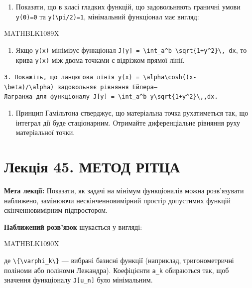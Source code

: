 \documentclass[
  ukrainian,
]{article}
\providecommand{\tightlist}{%
  \setlength{\itemsep}{0pt}\setlength{\parskip}{0pt}}
\begin{document}
\begin{enumerate}
\def\labelenumi{\arabic{enumi}.}
\tightlist
\item
  Показати, що в класі гладких функцій, що задовольняють граничні умови
  \texttt{y(0)=0} та \texttt{y(\textbackslash{}pi/2)=1}, мінімальний
  функціонал має вигляд:
\end{enumerate}

MATHBLK1089X

\begin{enumerate}
\def\labelenumi{\arabic{enumi}.}
\setcounter{enumi}{1}
\tightlist
\item
  Якщо \texttt{y(x)} мінімізує функціонал
  \texttt{J{[}y{]}\ =\ \textbackslash{}int\_a\^{}b\ \textbackslash{}sqrt\{1+y\textquotesingle{}\^{}2\}\textbackslash{},\ dx},
  то крива \texttt{y(x)} між двома точками є відрізком прямої лінії.
\end{enumerate}

\texttt{3.\ Покажіть,\ що\ ланцюгова\ лінія\ \textquotesingle{}y(x)\ =\ \textbackslash{}alpha\textbackslash{}cosh((x-\textbackslash{}beta)/\textbackslash{}alpha)\textquotesingle{}\ задовольняє\ рівняння\ Ейлера–Лагранжа\ для\ функціоналу\ \textquotesingle{}J{[}y{]}\ =\ \textbackslash{}int\_a\^{}b\ y\textbackslash{}sqrt\{1+y\textquotesingle{}\^{}2\}\textbackslash{},,dx\textquotesingle{}.}

\begin{enumerate}
\def\labelenumi{\arabic{enumi}.}
\setcounter{enumi}{3}
\tightlist
\item
  Принцип Гамільтона стверджує, що матеріальна точка рухатиметься так,
  що інтеграл дії буде стаціонарним. Отримайте диференціальне рівняння
  руху матеріальної точки.
\end{enumerate}

\section{Лекція 45. МЕТОД
РІТЦА}\label{ux43bux435ux43aux446ux456ux44f-45.-ux43cux435ux442ux43eux434-ux440ux456ux442ux446ux430}

\textbf{Мета лекції:} Показати, як задачі на мінімум функціоналів можна
розв'язувати наближено, замінюючи нескінченновимірний простір допустимих
функцій скінченновимірним підпростором.

\textbf{Наближений розв'язок} шукається у вигляді:

MATHBLK1090X

де
\texttt{\textbackslash{}\{\textbackslash{}varphi\_k\textbackslash{}\}}
--- вибрані базисні функції (наприклад, тригонометричні поліноми або
поліноми Лежандра). Коефіцієнти \texttt{a\_k} обираються так, щоб
значення функціоналу \texttt{J{[}u\_n{]}} було мінімальним.
\end{document}
